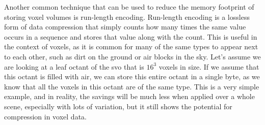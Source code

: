 \documentclass[titlepage]{article}
\begin{document}
Another common technique that can be used to reduce the memory footprint of storing voxel volumes is run-length encoding. Run-length encoding is a lossless form of data compression that simply counts how many times the same value occurs in a sequence and stores that value along with the count. This is useful in the context of voxels, as it is common for many of the same types to appear next to each other, such as dirt on the ground or air blocks in the sky. Let's assume we are looking at a leaf octant of the \gls{svo} that is $16^3$ voxels in size. If we assume that this octant is filled with air, we can store this entire octant in a single byte, as we know that all the voxels in this octant are of the same type. This is a very simple example, and in reality, the savings will be much less when applied over a whole scene, especially with lots of variation, but it still shows the potential for compression in voxel data.
\end{document}

